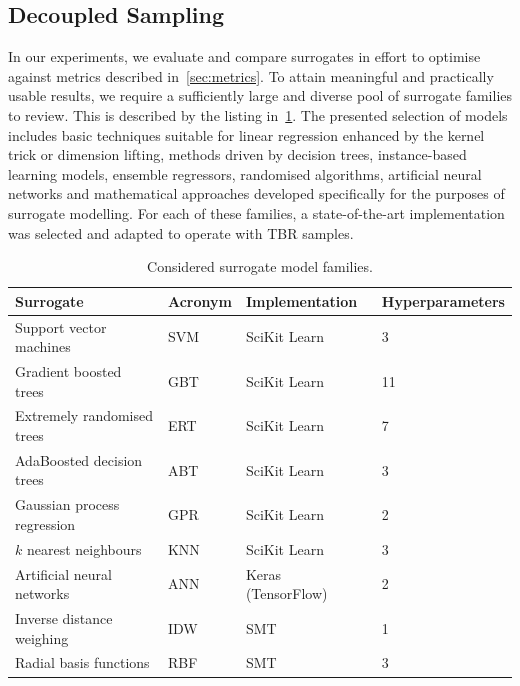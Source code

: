 \subsection{Decoupled Sampling}
\label{sec:supervised}

In our experiments, we evaluate and compare surrogates in effort to
optimise against metrics described in~\cref{sec:metrics}. To attain meaningful
and practically usable results, we require a sufficiently large and diverse pool
of surrogate families to review. This is described by the listing in~\cref{tbl:surrogates}. The presented selection of models includes basic
techniques suitable for linear regression enhanced by the kernel trick or dimension
lifting, methods driven by decision trees, instance-based learning models,
ensemble regressors, randomised algorithms, artificial neural networks and mathematical approaches
developed specifically for the purposes of surrogate modelling. For each of
these families, a state-of-the-art implementation was selected and adapted to
operate with TBR samples.

\begin{table}[h]
	\centering
	{\footnotesize
		\begin{tabular}{llll}
		\toprule
		Surrogate & Acronym & Implementation & Hyperparameters \\
		\midrule
		Support vector machines~\cite{fan2008liblinear}	& SVM & SciKit Learn~\cite{scikit-learn} & 3 \\
		Gradient boosted trees~\cite{friedman2001greedy,friedman1999stochastic,hastie2009elements}	& GBT & SciKit Learn & 11 \\
		Extremely randomised trees~\cite{geurts2006extremely}	& ERT & SciKit Learn & 7 \\
		AdaBoosted decision trees~\cite{drucker1997improving}	& ABT & SciKit Learn & 3 \\
		Gaussian process regression~\cite{williams2006gaussian}	& GPR & SciKit Learn & 2 \\
		$k$ nearest neighbours	& KNN & SciKit Learn & 3 \\
		Artificial neural networks	& ANN & Keras (TensorFlow)~\cite{chollet2015keras} & 2 \\
		Inverse distance weighing~\cite{shepard1968two} & IDW & SMT~\cite{SMT2019} & 1 \\
		Radial basis functions & RBF & SMT & 3 \\
		\bottomrule
		\end{tabular}
	}
	\caption{Considered surrogate model families.}
	\label{tbl:surrogates}
\end{table}

